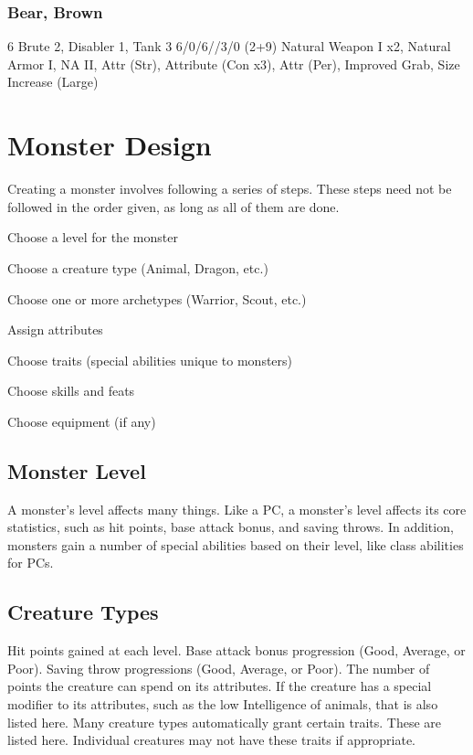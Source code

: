 \subsubsection{Bear, Brown}
 6
 Brute 2, Disabler 1, Tank 3
 6/0/6//3/0
 (2+9) Natural Weapon I x2, Natural Armor I, NA II, Attr (Str), Attribute (Con x3), Attr (Per), Improved Grab, Size Increase (Large)

\section{Monster Design}

Creating a monster involves following a series of steps. These steps need not be followed in the order given, as long as all of them are done.

\begin{enumerate*}
    \item Choose a level for the monster
    \item Choose a creature type (Animal, Dragon, etc.)
    \item Choose one or more archetypes (Warrior, Scout, etc.)
    \item Assign attributes
    \item Choose traits (special abilities unique to monsters)
    \item Choose skills and feats
    \item Choose equipment (if any)
\end{enumerate*}

\subsection{Monster Level}
A monster's level affects many things. Like a PC, a monster's level affects its core statistics, such as hit points, base attack bonus, and saving throws. In addition, monsters gain a number of special abilities based on their level, like class abilities for PCs.

\subsection{Creature Types}
 Hit points gained at each level.
 Base attack bonus progression (Good, Average, or Poor).
 Saving throw progressions (Good, Average, or Poor).
 The number of points the creature can spend on its attributes. If the creature has a special modifier to its attributes, such as the low Intelligence of animals, that is also listed here.
 Many creature types automatically grant certain traits. These are listed here. Individual creatures may not have these traits if appropriate.

